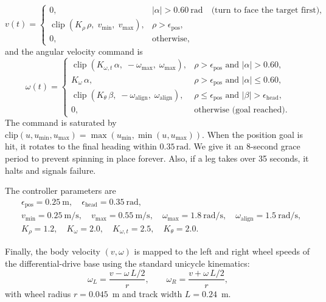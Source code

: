 \documentclass[11pt]{article}
\begin{document}
\begin{equation}
v(t)=
\begin{cases}
0, & |\alpha|>0.60\ \text{rad} \quad \text{(turn to face the target first)},\\[2pt]
\operatorname{clip}(K_\rho\,\rho,\;v_{\min},\;v_{\max}), &
   \rho>\epsilon_{\text{pos}},\\[2pt]
0, & \text{otherwise},
\end{cases}
\end{equation}
and the angular velocity command is
\begin{equation}
\omega(t)=
\begin{cases}
\operatorname{clip}(K_{\omega,t}\,\alpha,\;-\omega_{\max},\;\omega_{\max}), &
   \rho>\epsilon_{\text{pos}} \text{ and } |\alpha|>0.60,\\[2pt]
K_\omega\,\alpha, &
   \rho>\epsilon_{\text{pos}} \text{ and } |\alpha|\le 0.60,\\[2pt]
\operatorname{clip}(K_\theta\,\beta,\;-\omega_{\text{align}},\;\omega_{\text{align}}), &
   \rho\le\epsilon_{\text{pos}} \text{ and } |\beta|>\epsilon_{\text{head}},\\[2pt]
0, & \text{otherwise (goal reached)}.
\end{cases}
\end{equation}
The command is saturated by \(\mathrm{clip}(u, u_{\min}, u_{\max}) = \max(u_{\min}, \min(u, u_{\max}))\). When the position goal is hit, it rotates to the final heading within \(0.35\,\mathrm{rad}\). We give it an 8-second grace period to prevent spinning in place forever. Also, if a leg takes over 35 seconds, it halts and signals failure.

The controller parameters are
\begin{equation*}
\begin{aligned}
&\epsilon_{\text{pos}}=0.25\ \text{m},\quad \epsilon_{\text{head}}=0.35\ \text{rad},\\
&v_{\min}=0.25\ \text{m/s},\quad v_{\max}=0.55\ \text{m/s},\quad
\omega_{\max}=1.8\ \text{rad/s},\quad \omega_{\text{align}}=1.5\ \text{rad/s},\\
&K_\rho=1.2,\quad K_\omega=2.0,\quad K_{\omega,t}=2.5,\quad K_\theta=2.0.
\end{aligned}
\end{equation*}

Finally, the body velocity $(v,\omega)$ is mapped to the left and right wheel
speeds of the differential-drive base using the standard unicycle kinematics:
\begin{equation}
\omega_L=\frac{v-\omega\,L/2}{r},\qquad
\omega_R=\frac{v+\omega\,L/2}{r},
\end{equation}
with wheel radius $r=0.045$~m and track width $L=0.24$~m.
\end{document}
